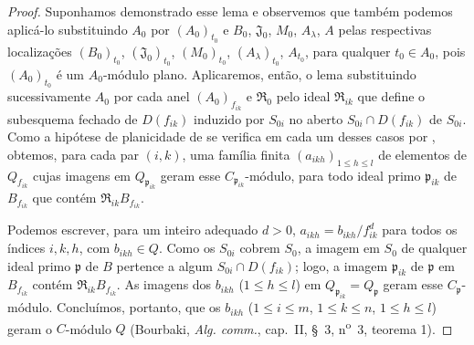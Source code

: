 \begin{proof}
Suponhamos demonstrado esse lema e observemos que também podemos aplicá-lo substituindo $A_0$ por $(A_0)_{t_0}$ e $B_0$, $\mathfrak J_0$, $M_0$, $A_\lambda$, $A$ pelas respectivas localizações $(B_0)_{t_0}$, $(\mathfrak J_0)_{t_0}$, $(M_0)_{t_0}$, $(A_\lambda)_{t_0}$, $A_{t_0}$, para qualquer $t_0\in A_0$, pois $(A_0)_{t_0}$ é um $A_0$-módulo plano. Aplicaremos, então, o lema substituindo sucessivamente $A_0$ por cada anel $(A_0)_{f_{ik}}$ e $\mathfrak R_0$ pelo ideal $\mathfrak R_{ik}$ que define o subesquema fechado de $D(f_{ik})$ induzido por $S_{0i}$ no aberto $S_{0i}\cap D(f_{ik})$ de $S_{0i}$. Como a hipótese de planicidade de  se verifica em cada um desses casos por , obtemos, para cada par $(i,k)$, uma família finita $(a_{ikh})_{1\leq h\leq l}$ de elementos de $Q_{f_{ik}}$ cujas imagens em $Q_{\mathfrak p_{ik}}$ geram esse $C_{\mathfrak p_{ik}}$-módulo, para todo ideal primo $\mathfrak p_{ik}$ de $B_{f_{ik}}$ que contém $\mathfrak R_{ik}B_{f_{ik}}$.

Podemos escrever, para um inteiro adequado $d>0$, $a_{ikh}=b_{ikh}/f_{ik}^d$ para todos os índices $i,k,h$, com $b_{ikh}\in Q$. Como os $S_{0i}$ cobrem $S_0$, a imagem em $S_0$ de qualquer ideal primo $\mathfrak p$ de $B$ pertence a algum $S_{0i}\cap D(f_{ik})$; logo, a imagem $\mathfrak p_{ik}$ de $\mathfrak p$ em $B_{f_{ik}}$ contém $\mathfrak R_{ik}B_{f_{ik}}$. As imagens dos $b_{ikh}$ ($1\leq h\leq l$) em $Q_{\mathfrak p_{ik}}=Q_{\mathfrak p}$ geram esse $C_{\mathfrak p}$-módulo. Concluímos, portanto, que os $b_{ikh}$ ($1\leq i\leq m$, $1\leq k\leq n$, $1\leq h\leq l$) geram o $C$-módulo $Q$ (Bourbaki, \emph{Alg. comm.}, cap.~II, \S~3, n\textsuperscript{o}~3, teorema 1).


\end{proof}
